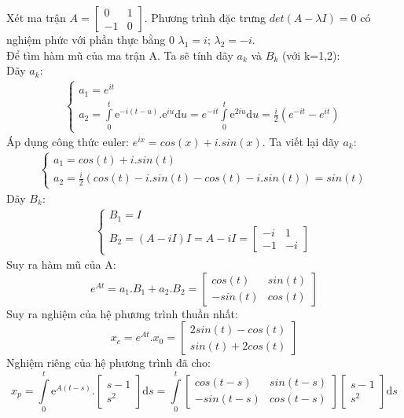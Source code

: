 Xét ma trận $A=
\begin{bmatrix}
    0&1\\
    -1&0
\end{bmatrix}.
$
 Phương trình đặc trưng $det(A- \lambda I)=0$ có nghiệm phức với phần thực bằng 0 $\lambda_1=i$; $\lambda_2=-i$.\\
Để tìm hàm mũ của ma trận A. Ta sẽ tính dãy $a_k$ và $B_k$ (với k=1,2):\\
Dãy $a_k$:
\begin{align*}
    \begin{cases}
        a_1=e^{it}\\
        a_2=\displaystyle\int\limits_{0}^{t} \mathrm{e}^{-i(t-u)}.\mathrm{e}^{iu}\mathrm{d}u=e^{-it}\displaystyle\int\limits_{0}^{t}\mathrm{e}^{2iu}\mathrm{d}u=\frac{i}{2}(e^{-it}-e^{it})
    \end{cases}
\end{align*}
Áp dụng công thức euler: $e^{ix}=cos(x)+i.sin(x)$. Ta viết lại dãy $a_k$:
\begin{align*}
    \begin{cases}
        a_1=cos(t)+i.sin(t)\\
        a_2=\frac{i}{2}(cos(t)-i.sin(t)-cos(t)-i.sin(t))=sin(t)
    \end{cases}
\end{align*}
Dãy $B_k$:
\begin{align*}
    \begin{cases}
        B_1=I\\
        B_2=(A-iI)I=A-iI=
        \begin{bmatrix}
            -i & 1\\
            -1 & -i
        \end{bmatrix}
    \end{cases}
\end{align*}
Suy ra hàm mũ của A:
$$e^{At}=a_1.B_1+a_2.B_2=
\begin{bmatrix}
    cos(t) & sin(t)\\
    -sin(t) & cos(t)
\end{bmatrix}
$$
Suy ra nghiệm của hệ phương trình thuần nhất:
$$x_c=e^{At}.x_0=
\begin{bmatrix}
    2sin(t)-cos(t)\\
    sin(t)+2cos(t)
\end{bmatrix}
$$
Nghiệm riêng của hệ phương trình đã cho:
$$
    x_p=\displaystyle\int\limits_{0}^{t} \mathrm{e}^{A(t-s)}.
    \begin{bmatrix}
    s-1\\
    s^2
\end{bmatrix}
    \mathrm{d}s
=\displaystyle\int\limits_{0}^{t}
\begin{bmatrix}
    cos(t-s) & sin(t-s)\\
    -sin(t-s) & cos(t-s)
\end{bmatrix}
\begin{bmatrix}
    s-1\\
    s^2
\end{bmatrix}
\mathrm{d}s
$$
